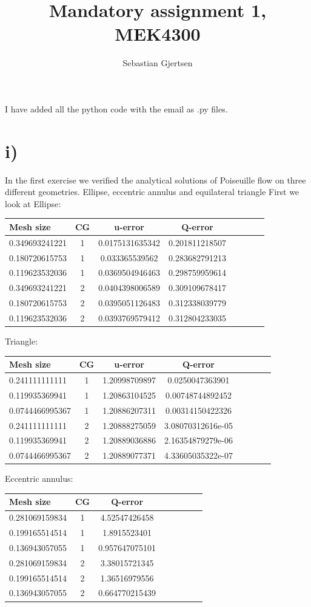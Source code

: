 \documentclass[a4paper,norsk]{article}
\title{Mandatory assignment 1, MEK4300}
\author{Sebastian Gjertsen}
\begin{document}
\maketitle
I have added all the python code with the email as .py files. 
\section*{i)}
In the first exercise we verified the analytical solutions of Poiseuille flow on three different geometries. Ellipse, eccentric annulus and equilateral triangle
\newline
First we look at Ellipse:
\newline
\begin{tabular}{l*{6}{c}r}
Mesh size              & CG & u-error & Q-error \\
\hline
0.349693241221 & 1 & 0.0175131635342 & 0.201811218507 \\
0.180720615753 & 1 & 0.033365539562 & 0.283682791213 \\
0.119623532036 & 1 & 0.0369504946463 & 0.298759959614\\
0.349693241221 & 2 & 0.0404398006589 & 0.309109678417 \\
0.180720615753& 2 & 0.0395051126483 & 0.312338039779 \\
0.119623532036 & 2 & 0.0393769579412 & 0.312804233035\\
\end{tabular}
\newline
Triangle:
\newline
\begin{tabular}{l*{6}{c}r}
Mesh size              & CG & u-error & Q-error \\
\hline
0.241111111111 & 1 & 1.20998709897 & 0.0250047363901\\
0.119935369941 & 1 & 1.20863104525 & 0.00748744892452\\
0.0744466995367 & 1 & 1.20886207311 & 0.00314150422326\\
0.241111111111 & 2 &  1.20888275059 & 3.08070312616e-05 \\
0.119935369941 & 2 & 1.20889036886 & 2.16354879279e-06 \\
0.0744466995367 & 2 & 1.20889077371 & 4.33605035322e-07 \\
\end{tabular}
\newline
Eccentric annulus:
\newline
\begin{tabular}{l*{6}{c}r}
Mesh size              & CG & Q-error \\
\hline
0.281069159834 & 1 & 4.52547426458 \\
0.199165514514 & 1 & 1.8915523401 \\
0.136943057055 & 1 & 0.957647075101\\
0.281069159834 & 2 & 3.38015721345\\
0.199165514514 & 2 & 1.36516979556\\
0.136943057055 & 2 & 0.664770215439\\
\end{tabular}
\newpage
\end{document}
